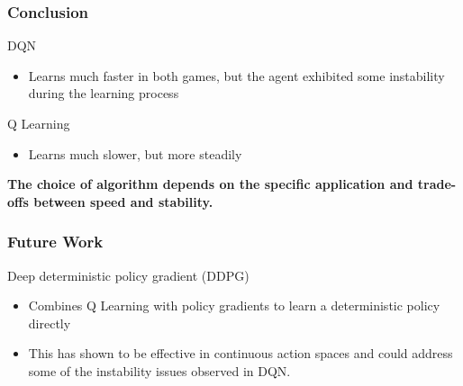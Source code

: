 \documentclass{beamer}
\begin{document}
\begin{frame}
    \frametitle{Conclusion}

    DQN \pause
    \begin{itemize}
        \item Learns much faster in both games, but the agent exhibited some instability
              during the learning process \pause
    \end{itemize}
    Q Learning \pause
    \begin{itemize}
        \item Learns much slower, but more steadily \pause
    \end{itemize}
    \medskip
    \textbf{The choice of algorithm depends on the specific application and trade-offs between speed and stability.}

\end{frame}

\begin{frame}
    \frametitle{Future Work}

    Deep deterministic policy gradient (DDPG) \pause
    \begin{itemize}
        \item Combines Q Learning with policy gradients to learn a deterministic policy
              directly \pause
        \item This has shown to be effective in continuous action spaces and could address
              some of the instability issues observed in DQN.
    \end{itemize}

\end{frame}
\end{document}
